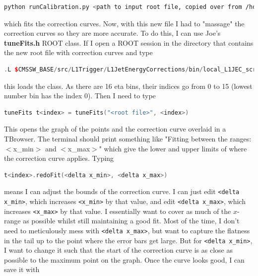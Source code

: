 \begin{lstlisting}[belowskip=-0.7cm, language=sh, numbers=none]
python runCalibration.py <path to input root file, copied over from /hdfs> <path and name of new root file> --redo-correction-fit --inherit-params --stage2
\end{lstlisting}

which fits the correction curves. Now, with this new file I had to "massage" the correction curves so they are more accurate. To do this, I can use Joe's \textbf{tuneFits.h} ROOT class. If I open a ROOT session in the directory that contains the new root file with correction curves and type

\begin{lstlisting}[belowskip=-0.7cm, language=C++, numbers=none]
.L $CMSSW_BASE/src/L1Trigger/L1JetEnergyCorrections/bin/local_L1JEC_scripts/tuneFits.h+
\end{lstlisting}

this loads the class. As there are 16 eta bins, their indices go from 0 to 15 (lowest number bin has the index 0). Then I need to type

\begin{lstlisting}[belowskip=-0.7cm, language=C++, numbers=none]
tuneFits t<index> = tuneFits("<root file>", <index>)
\end{lstlisting}

This opens the graph of the points and the correction curve overlaid in a TBrowser. The terminal should print something like "Fitting between the ranges: $<$x\_min$>$ and $<$x\_max$>$" which give the lower and upper limits of where the correction curve applies. Typing

\begin{lstlisting}[belowskip=-0.7cm, language=C++, numbers=none]
t<index>.redoFit(<delta x_min>, <delta x_max>)
\end{lstlisting}

means I can adjust the bounds of the correction curve. I can just edit \texttt{<delta x\_min>}, which increases \texttt{<x\_min>} by that value, and edit \texttt{<delta x\_max>}, which increases \texttt{<x\_max>} by that value. I essentially want to cover as much of the $x$-range as possible whilst still maintaining a good fit. Most of the time, I don't need to meticulously mess with \texttt{<delta x\_max>}, but want to capture the flatness in the tail up to the point where the error bars get large. But for \texttt{<delta x\_min>}, I want to change it such that the start of the correction curve is as close as possible to the maximum point on the graph. Once the curve looks good, I can save it with

